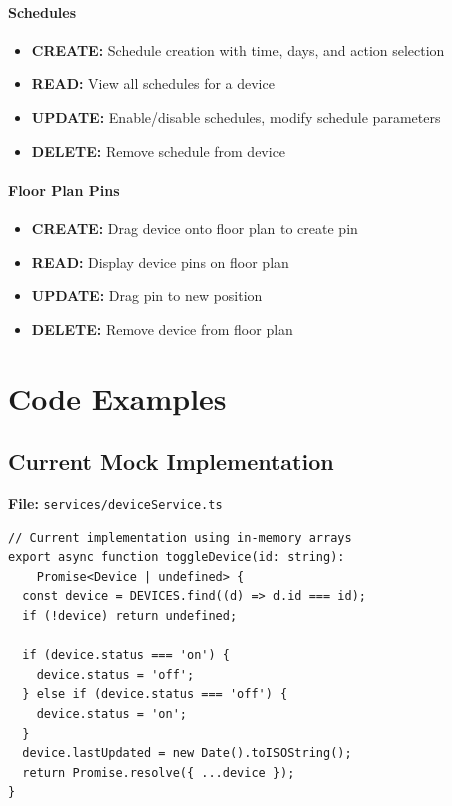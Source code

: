 \documentclass[12pt,a4paper]{article}
\begin{document}
\paragraph{Schedules}
\begin{itemize}[leftmargin=*]
    \item \textbf{CREATE:} Schedule creation with time, days, and action selection
    \item \textbf{READ:} View all schedules for a device
    \item \textbf{UPDATE:} Enable/disable schedules, modify schedule parameters
    \item \textbf{DELETE:} Remove schedule from device
\end{itemize}

\paragraph{Floor Plan Pins}
\begin{itemize}[leftmargin=*]
    \item \textbf{CREATE:} Drag device onto floor plan to create pin
    \item \textbf{READ:} Display device pins on floor plan
    \item \textbf{UPDATE:} Drag pin to new position
    \item \textbf{DELETE:} Remove device from floor plan
\end{itemize}


\newpage
\section{Code Examples}

\subsection{Current Mock Implementation}

\textbf{File:} \texttt{services/deviceService.ts}

\begin{verbatim}
// Current implementation using in-memory arrays
export async function toggleDevice(id: string): 
    Promise<Device | undefined> {
  const device = DEVICES.find((d) => d.id === id);
  if (!device) return undefined;

  if (device.status === 'on') {
    device.status = 'off';
  } else if (device.status === 'off') {
    device.status = 'on';
  }
  device.lastUpdated = new Date().toISOString();
  return Promise.resolve({ ...device });
}
\end{verbatim}
\end{document}
